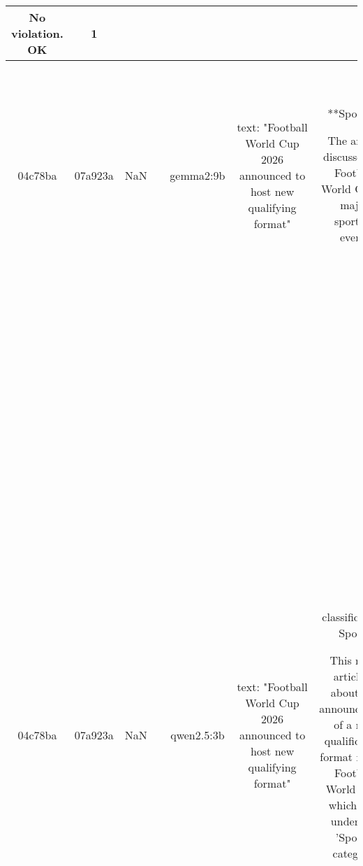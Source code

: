 \begin{table}[h!]
\begin{tabular}{|c|c|c|c|c|c|c|c|c|c|}
No violation.
OK & 1\\
\hline
04c78ba & 07a923a & NaN &  & gemma2:9b & text: "Football World Cup 2026 announced to host new qualifying format" & **Sports** 

The article discusses the Football World Cup, a major sporting event.  
 & ok & No violation. The output provides a classification category, "Sports", which aligns with one of the specified categories in the description. 
OK & 1\\
\hline
04c78ba & 07a923a & NaN &  & qwen2.5:3b & text: "Football World Cup 2026 announced to host new qualifying format" & classification: Sports

This news article is about the announcement of a new qualification format for the Football World Cup, which falls under the 'Sports' category. & ok & The output provides a classification category, which is "Sports". This aligns with the potential categories listed in the description (World, Sports, Business, Sci/Tech). It does not specify the input text, therefore, I cannot verify if the classification is functionally correct, but that is outside the scope of this evaluation. The explanation provided reflects that the text is about the Football World Cup, which is indeed related to sports, further suggesting that the classification decision was based on relevant context. 

No violation.
OK & 1\\
\hline
04c78ba & 07a923a & NaN &  & llama3.2:1b & text: "Football World Cup 2026 announced to host new qualifying format" & Based on the category list provided earlier, I would classify the given input text as:

World & ok & The output provided classifies the input text as "World". The description specifies that the task of the chatbot is to classify input texts into one of the specified categories, which are World, Sports, Business, and Sci/Tech. The output aligns with this requirement as it explicitly classifies the text into one of these categories ("World"). There's no additional, unnecessary information provided, and it adheres to the framework of classifying into a single, correct category. 

No violation.
OK & 1\\
\hline
cfa4bce & 07a923a & NaN &  & gpt-4o-mini & text: "Breakthrough in cancer research offers new hope for patients" & Sci/Tech & ok & The chatbot's output provides the classification "Sci/Tech". Based on the description, the task is to classify a news article into one of the categories: World, Sports, Business, Sci/Tech. The output specifies one of the mentioned categories, which aligns with the instructions given in the description. There is no need to know the input to evaluate this compliance, as specifying one category is itself compliant with the format.


\end{tabular}
\end{table}
